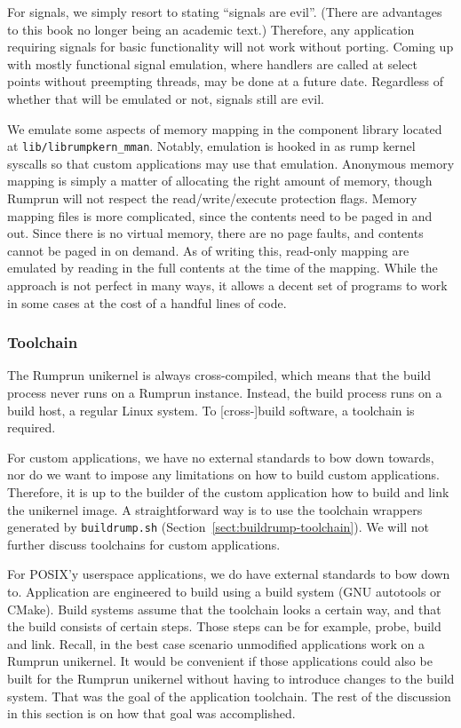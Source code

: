 For signals, we simply resort to stating ``signals are evil''.  (There are
advantages to this book no longer being an academic text.)  Therefore,
any application requiring signals for basic functionality will not work
without porting.  Coming up with mostly functional signal emulation,
where handlers are called at select points without preempting threads,
may be done at a future date.  Regardless of whether that will be emulated
or not, signals still are evil.

We emulate some aspects of memory mapping in the component
library located at \verb+lib/librumpkern_mman+.  Notably, emulation is
hooked in as rump kernel syscalls so that custom applications
may use that emulation.  Anonymous memory mapping is simply a
matter of allocating the right amount of memory, though Rumprun will not
respect the read/write/execute protection flags.  Memory mapping files
is more complicated, since the contents need to be paged in and out.
Since there is no virtual memory, there are no page faults, and contents
cannot be paged in on demand.  As of writing this, read-only mapping are
emulated by reading in the full contents at the time of the mapping.
While the approach is not perfect in many ways, it allows a decent set of
programs to work in some cases at the cost of a handful lines of code.


\subsubsection{Toolchain}

The Rumprun unikernel is always cross-compiled, which
means that the build process never runs on a Rumprun instance.  Instead,
the build process runs on a build host, \eg a regular Linux system.
To [cross-]build software, a toolchain is required.

For custom applications, we have no external standards to bow down
towards, nor do we want to impose any limitations on how to build
custom applications.  Therefore, it is up to the builder of the custom
application how to build and link the unikernel image.  A straightforward
way is to use the toolchain wrappers generated by \texttt{buildrump.sh}
(Section~\ref{sect:buildrump-toolchain}).  We will not further
discuss toolchains for custom applications.

For POSIX'y userspace applications, we do have external standards to bow down to.
Application are engineered to build using a build system (\eg GNU autotools or CMake).  Build systems assume that the toolchain
looks a certain way, and that the build consists of certain steps.
Those steps can be for example, probe, build and link.  Recall, in the best case
scenario unmodified applications work on a Rumprun unikernel.
It would be convenient if those applications could also be built for
the Rumprun unikernel without having to introduce changes to the build
system.  That was the goal of the application toolchain.  The rest of
the discussion in this section is on how that goal was accomplished.


